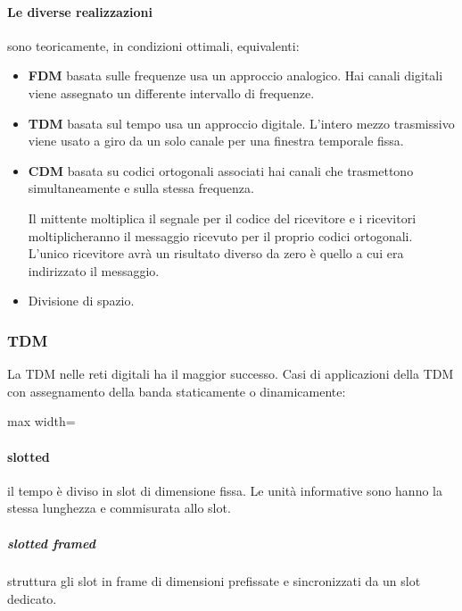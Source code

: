 \paragraph{Le diverse realizzazioni} sono teoricamente, in condizioni ottimali, equivalenti:
\begin{itemize}
	\item \textbf{FDM} basata sulle frequenze usa un approccio analogico. Hai canali digitali viene assegnato un differente intervallo di frequenze.
	\item \textbf{TDM} basata sul tempo usa un approccio digitale. L'intero mezzo trasmissivo viene usato a giro da un solo canale per una finestra temporale fissa.
	\item \textbf{CDM} basata su codici ortogonali associati hai canali che trasmettono simultaneamente e sulla stessa frequenza.

	Il mittente moltiplica il segnale per il codice del ricevitore e i ricevitori moltiplicheranno il messaggio ricevuto per il proprio codici ortogonali. L'unico ricevitore avrà un risultato diverso da zero è quello a cui era indirizzato il messaggio.
	\item Divisione di spazio.
\end{itemize}
\subsubsection{TDM}
La TDM nelle reti digitali ha il maggior successo.
Casi di applicazioni della TDM con assegnamento della banda staticamente o dinamicamente:

\medskip
\begin{adjustbox}{max width=\textwidth}
\end{adjustbox}
\paragraph{slotted} il tempo è diviso in slot di dimensione fissa. Le unità informative sono hanno la stessa lunghezza e commisurata allo slot.
	\subparagraph{slotted framed} struttura gli slot in frame di dimensioni prefissate e sincronizzati da un slot dedicato.

